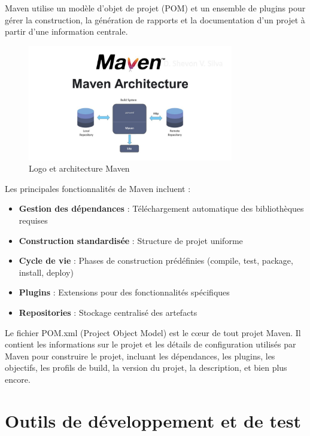 \documentclass[12pt,a4paper]{report}
\begin{document}
Maven utilise un modèle d'objet de projet (POM) et un ensemble de plugins pour gérer la construction, la génération de rapports et la documentation d'un projet à partir d'une information centrale.

\begin{figure}[htbp]
    \centering
    \includegraphics[width=0.8\textwidth]{latex_media/media/maven.png}
    \caption{Logo et architecture Maven}
    \label{fig:maven-logo}
\end{figure}

Les principales fonctionnalités de Maven incluent :

\begin{itemize}
    \item \textbf{Gestion des dépendances} : Téléchargement automatique des bibliothèques requises
    \item \textbf{Construction standardisée} : Structure de projet uniforme
    \item \textbf{Cycle de vie} : Phases de construction prédéfinies (compile, test, package, install, deploy)
    \item \textbf{Plugins} : Extensions pour des fonctionnalités spécifiques
    \item \textbf{Repositories} : Stockage centralisé des artefacts
\end{itemize}



Le fichier POM.xml (Project Object Model) est le cœur de tout projet Maven. Il contient les informations sur le projet et les détails de configuration utilisés par Maven pour construire le projet, incluant les dépendances, les plugins, les objectifs, les profils de build, la version du projet, la description, et bien plus encore.

\section{Outils de développement et de test}
\end{document}
